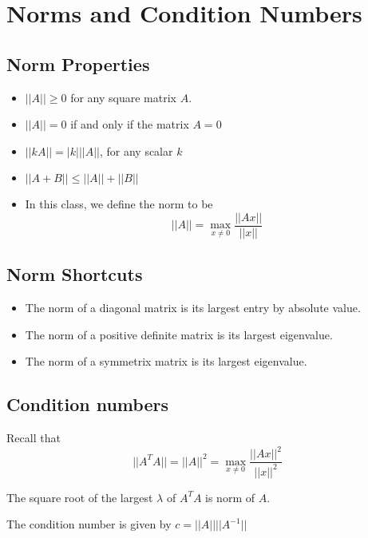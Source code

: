 \documentclass{article}
\begin{document}
\section{Norms and Condition Numbers}

\subsection{Norm Properties}

\begin{itemize}
	\item $||A||\ge 0$ for any square matrix $A$.
	\item $||A|| = 0$ if and only if the matrix $A=0$
	\item $||kA|| = |k| ||A||$, for any scalar $k$
	\item $||A+B||\le ||A|| + ||B||$
	\item In this class, we define the norm to be $$||A||=\max_{x\neq 0}\frac{||Ax||}{||x||}$$
\end{itemize}

\subsection{Norm Shortcuts}

\begin{itemize}
	\item The norm of a diagonal matrix is its largest entry by absolute value.
	\item The norm of a positive definite matrix is its largest eigenvalue.
	\item The norm of a symmetrix matrix is its largest eigenvalue.
\end{itemize}

\subsection{Condition numbers}

Recall that $$||A^TA||=||A||^2=\max_{x\neq 0}\frac{||Ax||^2}{||x||^2}$$

The square root of the largest $\lambda$ of $A^TA$ is norm of $A$.

The condition number is given by $c=||A||||A^{-1}||$
\end{document}
